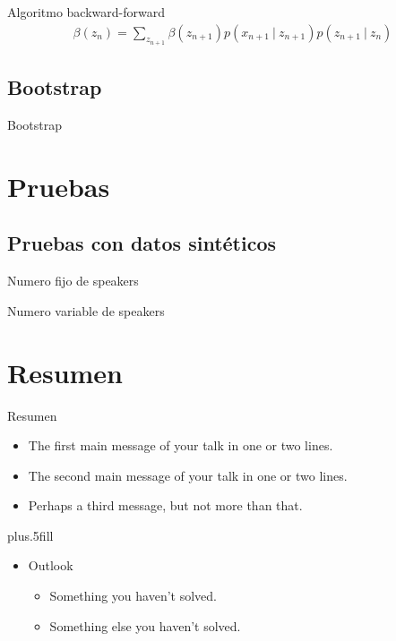 \documentclass[10pt]{beamer}
\begin{document}
\begin{frame}{Algoritmo backward-forward}
  \begin{align}
    \beta(z_n) = \sum_{z_{n+1}} \beta(z_{n+1})p(x_{n+1} ~|~ z_{n+1}) p(z_{n+1} ~|~ z_n)
  \end{align}  
\end{frame}

\subsection{Bootstrap}
\begin{frame}{Bootstrap}
\end{frame}

\section{Pruebas}

\subsection{Pruebas con datos sintéticos}

\begin{frame}{Numero fijo de speakers}
\end{frame}

\begin{frame}{Numero variable de speakers}
\end{frame}

\section*{Resumen}

\begin{frame}{Resumen}
  \begin{itemize}
  \item
    The \alert{first main message} of your talk in one or two lines.
  \item
    The \alert{second main message} of your talk in one or two lines.
  \item
    Perhaps a \alert{third message}, but not more than that.
  \end{itemize}
  
  \vskip0pt plus.5fill
  \begin{itemize}
  \item
    Outlook
    \begin{itemize}
    \item
      Something you haven't solved.
    \item
      Something else you haven't solved.
    \end{itemize}
  \end{itemize}
\end{frame}
\end{document}
